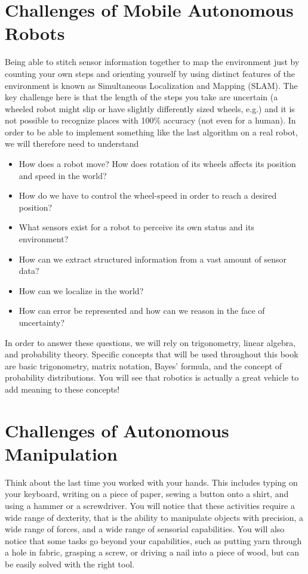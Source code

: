 \section{Challenges of Mobile Autonomous Robots}

Being able to stitch sensor information together to map the environment just by counting your own steps and orienting yourself by using distinct features of the environment is known as Simultaneous Localization and Mapping (SLAM). The key challenge here is that the length of the steps you take are uncertain (a wheeled robot might slip or have slightly differently sized wheels, e.g.) and it is not possible to recognize places with 100\% accuracy (not even for a human). In order to be able to implement something like the last algorithm on a real robot, we will therefore need to understand

\begin{itemize}
\item How does a robot move? How does rotation of its wheels affects its position and speed in the world?
\item How do we have to control the wheel-speed in order to reach a desired position?
\item What sensors exist for a robot to perceive its own status and its environment?
\item How can we extract structured information from a vast amount of sensor data?
\item How can we localize in the world?
\item How can error be represented and how can we reason in the face of uncertainty?
\end{itemize}

In order to answer these questions, we will rely on trigonometry, linear algebra, and probability theory. Specific concepts that will be used throughout this book are basic trigonometry, matrix notation, Bayes' formula, and the concept of probability distributions. You will see that robotics is actually a great vehicle to add meaning to these concepts!


\section{Challenges of Autonomous Manipulation}
Think about the last time you worked with your hands. This includes typing on your keyboard, writing on a piece of paper, sewing a button onto a shirt, and using a hammer or a screwdriver. You will notice that these activities require a wide range of dexterity, that is the ability to manipulate objects with precision, a wide range of forces, and a wide range of sensorial capabilities. You will also notice that some tasks go beyond your capabilities, such as putting yarn through a hole in fabric, grasping a screw, or driving a nail into a piece of wood, but can be easily solved with the right tool.

